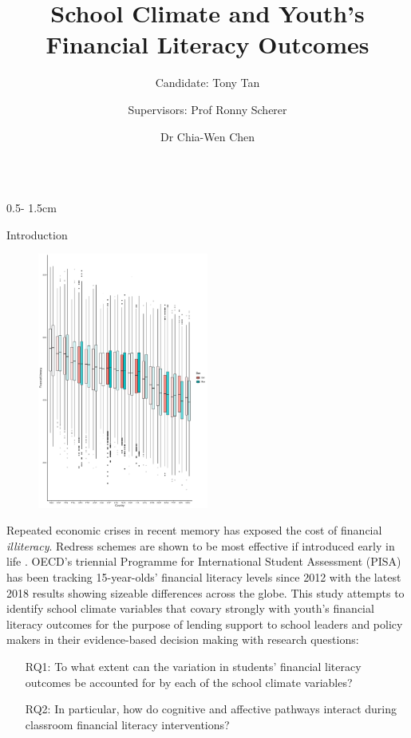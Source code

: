 \documentclass{uioposter}
\title{School Climate and Youth's Financial Literacy Outcomes}
\author
{%
    Candidate: Tony Tan%
    \and
    Supervisors: Prof Ronny Scherer%
    \and
    Dr Chia-Wen Chen%
}
\institute{Centre for Educational Measurement, Faculty of Educational Sciences, University of Oslo}
\begin{document}
\begin{frame}

\begin{columns}[onlytextwidth]

\begin{column}{0.5\textwidth - 1.5cm}

    \begin{block}{Introduction}
        \begin{figure}
            \centering
            \includegraphics[width=0.5\textwidth]{../Figures/distribution.pdf}
        \end{figure}
        Repeated economic crises in recent memory has exposed the cost of financial \emph{illiteracy}. Redress schemes are shown to be most effective if introduced early in life \parencite{lusardi:2014}. OECD's triennial Programme for International Student Assessment (PISA) has been tracking 15-year-olds' financial literacy levels since 2012 with the latest 2018 results showing sizeable differences across the globe. This study attempts to identify school climate variables that covary strongly with youth's financial literacy outcomes for the purpose of lending support to school leaders and policy makers in their evidence-based decision making with research questions:

        \begin{enumerate}
            \item[RQ1:] To what extent can the variation in students' financial literacy outcomes be accounted for by each of the school climate variables?
            \item[RQ2:] In particular, how do cognitive and affective pathways interact during classroom financial literacy interventions?
        \end{enumerate}
    \end{block}


\end{column}
\end{columns}
\end{frame}
\end{document}
